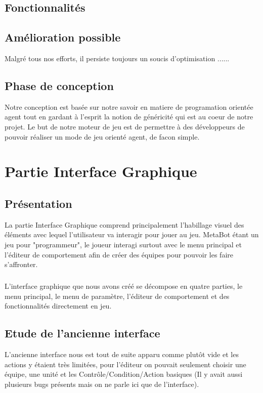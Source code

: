 \documentclass{report}
\begin{document}
\section{Fonctionnalités}



\section{Amélioration possible}

Malgré tous nos efforts, il persiste toujours un soucis d'optimisation ......

\section{Phase de conception}
Notre conception est basée sur notre savoir en matiere de programation orientée agent tout en gardant à l'esprit la notion de généricité qui est au coeur de notre projet.
Le but de notre moteur de jeu est de permettre à des développeurs de pouvoir réaliser un mode de jeu orienté agent, de facon simple.
\newpage
\chapter{Partie Interface Graphique}
\section{Présentation}
La partie Interface Graphique comprend principalement l'habillage visuel des éléments avec lequel l'utilisateur va interagir pour jouer au jeu. MetaBot étant un jeu pour "programmeur", le joueur interagi surtout avec le menu principal et l'éditeur de comportement afin de créer des équipes pour pouvoir les faire s'affronter.
\paragraph{}
L'interface graphique que nous avons créé se décompose en quatre parties, le menu principal, le menu de paramètre, l'éditeur de comportement et des fonctionnalités directement en jeu.
\section{Etude de l'ancienne interface}
L'ancienne interface nous est tout de suite apparu comme plutôt vide et les actions y étaient très limitées, pour l'éditeur on pouvait seulement choisir une équipe, une unité et les Contrôle/Condition/Action basiques (Il y avait aussi plusieurs bugs présents mais on ne parle ici que de l'interface).
\end{document}
